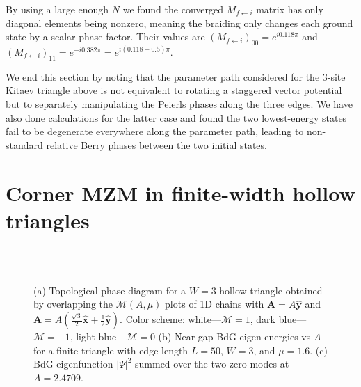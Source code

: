 \documentclass[aps,prb,showpacs,amsmath,amssymb,superscriptaddress]{revtex4-2}
\let\oldhat\hat
\renewcommand{\hat}[1]{\oldhat{\mathbf{#1}}}
\begin{document}
By using a large enough $N$ we found the converged $M_{f\leftarrow i}$ matrix has only diagonal elements being nonzero, meaning the braiding only changes each ground state by a scalar phase factor. Their values are $(M_{f\leftarrow i})_{00} = e^{i0.118\pi}$ and $(M_{f\leftarrow i})_{11} = e^{-i 0.382\pi} = e^{i(0.118-0.5)\pi}$.

We end this section by noting that the parameter path considered for the 3-site Kitaev triangle above is not equivalent to rotating a staggered vector potential but to separately manipulating the Peierls phases along the three edges. We have also done calculations for the latter case and found the two lowest-energy states fail to be degenerate everywhere along the parameter path, leading to non-standard relative Berry phases between the two initial states.

\section{Corner MZM in finite-width hollow triangles}

\begin{figure}[ht]
  \hspace{28pt}
   \\
  \vspace{-20pt}
   \\
  \hspace{70pt}
  \caption{(a) Topological phase diagram for a $W=3$ hollow triangle obtained by overlapping the $\mathcal{M}(A, \mu)$ plots of 1D chains with $\mathbf A = A\hat{y}$ and $\mathbf A = A(\frac{\sqrt{      3}}{2}\hat{x}+\frac{1}{2}\hat{y})$. Color scheme: white---$\mathcal{M}=1$, dark blue---$\mathcal{M}=-1$, light blue---$\mathcal{M}=0$ (b) Near-gap BdG eigen-energies vs $A$ for a finite triangle with edge length $L=50$, $W=3$, and $\mu=1.6$. (c) BdG eigenfunction $|\Psi|^2$ summed over the two zero modes at $A=2.4709$.}
  \label{fig: supp pd}
\end{figure}
\end{document}
